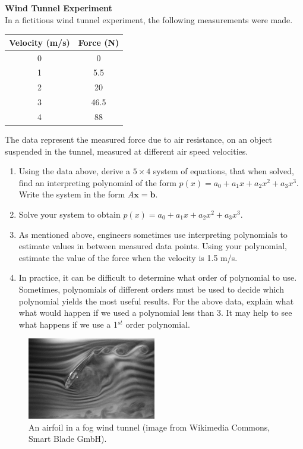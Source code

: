 \documentclass{article}
\begin{document}
\begin{enumerate}
\textbf{Wind Tunnel Experiment}\\
In a fictitious wind tunnel experiment, the following measurements were made. 
\begin{center}
  \begin{tabular}{ c c }
    Velocity (m/s) & Force (N)  \\ \hline
     0  & 0 \\
    1 & 5.5 \\
    2 & 20 \\
    3 & 46.5 \\
    4 & 88
  \end{tabular}
\end{center}

The data represent the measured force due to air resistance, on an object suspended in the tunnel, measured at different air speed velocities.
\begin{enumerate}
\item Using the data above, derive a $5\times4$ system of equations, that when solved, find an interpreting polynomial of the form $p(x) = a_0+a_1x+a_2x^2+a_3x^3$. Write the system in the form $A\mathbf{x}=\mathbf{b}$.
\item Solve your system to obtain $p(x) = a_0+a_1x+a_2x^2+a_3x^3$.
\item As mentioned above, engineers sometimes use interpreting polynomials to estimate values in between measured data points. Using your polynomial, estimate the value of the force when the velocity is 1.5 m/s. 
\item In practice, it can be difficult to determine what order of polynomial to use. Sometimes, polynomials of different orders must be used to decide which polynomial yields the most useful results. For the above data, explain what what would happen if we used a polynomial less than 3. It may help to see what happens if we use a 1$^{st}$ order polynomial. 
\end{enumerate}

\end{enumerate}
\begin{figure}[h]
  \vspace{-13pt}
  \begin{center}
    \includegraphics[width=0.5\textwidth]{WindTunnel.jpg}
  \end{center}
  \vspace{-20pt}
  \caption{\small{An airfoil in a fog wind tunnel (image from Wikimedia Commons, Smart Blade GmbH).}}
\end{figure}
\end{document}
